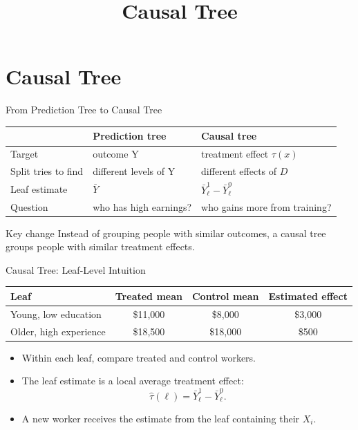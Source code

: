 \documentclass[hyperref={pdfpagelabels=false}]{beamer}
\begin{document}
\title[]
{Causal Tree}

\subtitle{}
\author{}
\institute{}
\date{}

\begin{frame}{}
  \titlepage
\end{frame}

\section{Causal Tree}

\begin{frame}{From Prediction Tree to Causal Tree}
\begin{center}
\small
\begin{tabular}{lll}
\toprule
 & Prediction tree & Causal tree \\
\midrule
Target & outcome $\mathrm{Y}$ & treatment effect $\tau(x)$ \\
Split tries to find & different levels of $\mathrm{Y}$ & different effects of $D$ \\
Leaf estimate & $\bar{Y}$ & $\bar{Y}^{1}_{\ell}-\bar{Y}^{0}_{\ell}$ \\
Question & who has high earnings? & who gains more from training? \\
\bottomrule
\end{tabular}
\end{center}

\vspace{0.35cm}
\begin{block}{Key change}
Instead of grouping people with similar outcomes, a causal tree groups people with similar treatment effects.
\end{block}
\end{frame}

\begin{frame}{Causal Tree: Leaf-Level Intuition}
\begin{center}
\small
\begin{tabular}{lccc}
\toprule
Leaf & Treated mean & Control mean & Estimated effect \\
\midrule
Young, low education & \$11,000 & \$8,000 & \$3,000 \\
Older, high experience & \$18,500 & \$18,000 & \$500 \\
\bottomrule
\end{tabular}
\end{center}

\vspace{0.3cm}
\begin{itemize}
  \item Within each leaf, compare treated and control workers.
  \vspace{0.2cm}
  \item The leaf estimate is a local average treatment effect:
  \[
    \hat{\tau}(\ell)=\bar{Y}^{1}_{\ell}-\bar{Y}^{0}_{\ell}.
  \]
  \vspace{0.2cm}
  \item A new worker receives the estimate from the leaf containing their $X_i$.
\end{itemize}
\end{frame}
\end{document}
